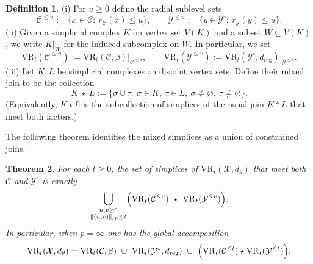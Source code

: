 \documentclass[11pt]{amsart}
\newtheorem{theorem}{Theorem}[section]
\theoremstyle{definition}
\newtheorem{definition}[theorem]{Definition}
\theoremstyle{remark}
\newcommand{\1}{\mathbbm{1}}
\newcommand{\norm}[1]{\left\lVert #1\right\rVert}
\begin{document}
\begin{definition}
\label{def:rips-join}
(i) For $u\ge 0$ define the radial sublevel sets
\[
\mathcal C^{\le u}:=\{x\in\mathcal C:\ r_{\mathcal C}(x)\le u\},
\qquad
\mathcal Y^{\le u}:=\{y\in\mathcal Y^\circ:\ r_{\mathcal Y}(y)\le u\}.
\]
(ii) Given a simplicial complex \(K\) on vertex set \(V(K)\) and a subset \(W\subseteq V(K)\), we write
\(K|_W\) for the induced subcomplex on \(W\).
In particular, we set
\[
\mathrm{VR}_t(\mathcal C^{\le u})
:=\mathrm{VR}_t(\mathcal C,\beta)\big|_{\mathcal C^{\le u}},
\qquad
\mathrm{VR}_t(\mathcal Y^{\le v})
:=\mathrm{VR}_t(\mathcal Y^\circ,d_{\mathrm{reg}})\big|_{\mathcal Y^{\le v}}.
\]
(iii) Let \(K,L\) be simplicial complexes on disjoint vertex sets.
Define their mixed join to be the collection
\[
K\ \star\ L
:=\bigl\{\sigma\cup\tau:\ \sigma\in K,\ \tau\in L,\ \sigma\neq\varnothing,\ \tau\neq\varnothing\bigr\}.
\]
(Equivalently, \(K\star L\) is the subcollection of simplices of the usual join \(K*L\) that meet both factors.)
\end{definition}
The following theorem identifies the mixed simplices as a union of constrained joins.
\begin{theorem}
\label{thm:rips-join}
For each \(t\ge 0\), the set of simplices of \(\mathrm{VR}_t(\mathcal X,d_\theta)\) that meet both
\(\mathcal C\) and \(\mathcal Y^\circ\) is exactly
\[
\bigcup_{\substack{u,v\ge 0\\ \norm{(u,v)}_{\ell^p}\le t}}
\Bigl(\mathrm{VR}_t(\mathcal C^{\le u})\ \star\ \mathrm{VR}_t(\mathcal Y^{\le v})\Bigr).
\]
In particular, when \(p=\infty\) one has the global decomposition
\begin{equation}\label{eq:rips-pinf-decomp}
\mathrm{VR}_t(\mathcal X,d_\theta)
=
\mathrm{VR}_t(\mathcal C,\beta)\ \cup\ \mathrm{VR}_t(\mathcal Y^\circ,d_{\mathrm{reg}})
\ \cup\ \Bigl(\mathrm{VR}_t(\mathcal C^{\le t}) \star \mathrm{VR}_t(\mathcal Y^{\le t})\Bigr).
\end{equation}
\end{theorem}
\end{document}
